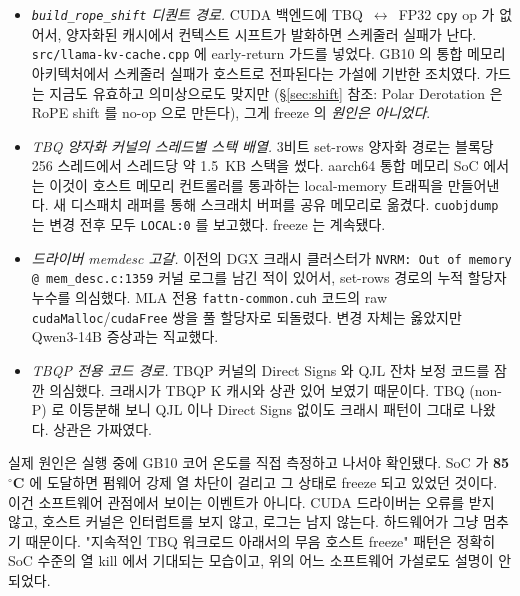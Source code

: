 \documentclass[10pt,twocolumn]{article}
\begin{document}
\begin{itemize}[leftmargin=*,topsep=1pt,itemsep=1pt]
\item \emph{\texttt{build\_rope\_shift} 디퀀트 경로.} CUDA 백엔드에 TBQ~$\leftrightarrow$~FP32 \texttt{cpy} op 가 없어서, 양자화된 캐시에서 컨텍스트 시프트가 발화하면 스케줄러 실패가 난다. \texttt{src/llama-kv-cache.cpp} 에 early-return 가드를 넣었다. GB10 의 통합 메모리 아키텍처에서 스케줄러 실패가 호스트로 전파된다는 가설에 기반한 조치였다. 가드는 지금도 유효하고 의미상으로도 맞지만 (\S\ref{sec:shift} 참조: Polar Derotation 은 RoPE shift 를 no-op 으로 만든다), 그게 freeze 의 \emph{원인은 아니었다}.
\item \emph{TBQ 양자화 커널의 스레드별 스택 배열.} 3비트 set-rows 양자화 경로는 블록당 256 스레드에서 스레드당 약 1.5~KB 스택을 썼다. aarch64 통합 메모리 SoC 에서는 이것이 호스트 메모리 컨트롤러를 통과하는 local-memory 트래픽을 만들어낸다. 새 디스패치 래퍼를 통해 스크래치 버퍼를 공유 메모리로 옮겼다. \texttt{cuobjdump} 는 변경 전후 모두 \texttt{LOCAL:0} 를 보고했다. freeze 는 계속됐다.
\item \emph{드라이버 memdesc 고갈.} 이전의 DGX 크래시 클러스터가 \texttt{NVRM: Out of memory @ mem\_desc.c:1359} 커널 로그를 남긴 적이 있어서, set-rows 경로의 누적 할당자 누수를 의심했다. MLA 전용 \texttt{fattn-common.cuh} 코드의 raw \texttt{cudaMalloc}/\texttt{cudaFree} 쌍을 풀 할당자로 되돌렸다. 변경 자체는 옳았지만 Qwen3-14B 증상과는 직교했다.
\item \emph{TBQP 전용 코드 경로.} TBQP 커널의 Direct Signs 와 QJL 잔차 보정 코드를 잠깐 의심했다. 크래시가 TBQP K 캐시와 상관 있어 보였기 때문이다. TBQ (non-P) 로 이등분해 보니 QJL 이나 Direct Signs 없이도 크래시 패턴이 그대로 나왔다. 상관은 가짜였다.
\end{itemize}

실제 원인은 실행 중에 GB10 코어 온도를 직접 측정하고 나서야 확인됐다. SoC 가 \textbf{85$^\circ$C} 에 도달하면 펌웨어 강제 열 차단이 걸리고 그 상태로 freeze 되고 있었던 것이다. 이건 소프트웨어 관점에서 보이는 이벤트가 아니다. CUDA 드라이버는 오류를 받지 않고, 호스트 커널은 인터럽트를 보지 않고, 로그는 남지 않는다. 하드웨어가 그냥 멈추기 때문이다. "지속적인 TBQ 워크로드 아래서의 무음 호스트 freeze" 패턴은 정확히 SoC 수준의 열 kill 에서 기대되는 모습이고, 위의 어느 소프트웨어 가설로도 설명이 안 되었다.
\end{document}
